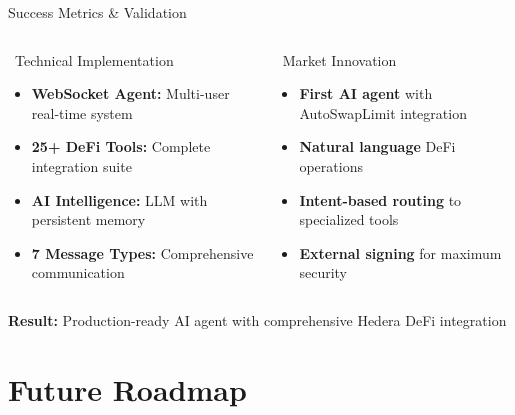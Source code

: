 \documentclass[aspectratio=169]{beamer}
\begin{document}
\begin{frame}{Success Metrics \& Validation}
\begin{columns}
\begin{block}{\faCheckCircle\ Technical Implementation}
\begin{itemize}
\item \textbf{WebSocket Agent:} Multi-user real-time system
\item \textbf{25+ DeFi Tools:} Complete integration suite
\item \textbf{AI Intelligence:} LLM with persistent memory
\item \textbf{7 Message Types:} Comprehensive communication
\end{itemize}
\end{block}

\begin{block}{\faUsers\ Market Innovation}
\begin{itemize}
\item \textbf{First AI agent} with AutoSwapLimit integration
\item \textbf{Natural language} DeFi operations
\item \textbf{Intent-based routing} to specialized tools
\item \textbf{External signing} for maximum security
\end{itemize}
\end{block}
\end{columns}

\vspace{0.05cm}
\begin{center}
\footnotesize \textbf{Result:} Production-ready AI agent with comprehensive Hedera DeFi integration
\end{center}
\end{frame}

\section{Future Roadmap}
\end{document}
